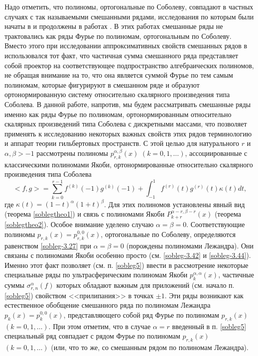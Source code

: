 Надо отметить, что полиномы, ортогональные по Соболеву, совпадают в частных случаях с так называемыми смешанными рядами, 
исследования по которым были начаты в \cite{sobleg-Shar11} и продолжены в работах
\cite{sobleg-Shar12, sobleg-Shar13, sobleg-Shar15, sobleg-Shar16, sobleg-Shar17, sobleg-Shar18, sobleg-sharap3}.  В этих работах смешанные ряды не трактовались как ряды Фурье по полиномам, ортогональным по Соболеву. Вместо этого при исследовании аппроксимативных свойств смешанных рядов в \cite{sobleg-Shar11, sobleg-Shar12, sobleg-Shar13, sobleg-Shar15, sobleg-Shar16, sobleg-Shar17, sobleg-Shar18, sobleg-sharap3} использовался тот факт, что  частичная сумма смешанного ряда представляет собой проектор на соответствующее подпространство алгебраических полиномов, не обращая внимание на то, что она является суммой Фурье по тем самым полиномам, которые фигурируют в смешанном ряде и образуют ортонормированную систему относительно скалярного произведения типа Соболева. В данной работе, напротив,  мы будем рассматривать смешанные ряды именно как ряды Фурье по полиномам, ортонормированным относительно скалярных произведений типа Соболева с дискретными массами, что позволяет применять к исследованию некоторых важных свойств этих рядов  терминологию и аппарат теории гильбертовых пространств. С этой целью для  натурального $r$ и $\alpha,\beta>-1$ рассмотрены полиномы $p^{\alpha,\beta}_{r,k}(x)$ $(k=0,1,\ldots)$, ассоциированные с  классическими полиномами Якоби, ортонормированные относительно скалярного произведения типа Соболева
\begin{equation}\label{sobleg-1.1}
<f,g>=\sum_{k=0}^{r-1}f^{(k)}(-1)g^{(k)}(-1)+\int_{-1}^1 f^{(r)}(t)g^{(r)}(t)\kappa(t)dt,
\end{equation}
где $\kappa(t)=(1-t)^\alpha(1+t)^\beta$. Для этих полиномов установлены явный вид (теорема \ref{soblegtheo1})  и связь с полиномами Якоби $P_{k+r}^{\alpha-r,\beta-r}(x)$ (теорема \ref{soblegtheo2}).  Особое внимание уделено случаю $\alpha=\beta=0$. Соответствующие полиномы $p_{r,k}(x)=p^{0,0}_{r,k}(x)$, ортогональные по Соболеву, определяются равенством \eqref{sobleg-3.27} при $\alpha=\beta=0$ (порождены полиномами Лежандра). Они связаны с полиномами Якоби особенно просто (см.  \eqref{sobleg-3.42} и \eqref{sobleg-3.44}). Именно этот факт позволяет   (см. п. \ref{sobleg5}) ввести в рассмотрение некоторые специальные ряды по ультрасферическим полиномам Якоби $p_k^{\alpha,\alpha}(x)$, частичные суммы $\sigma_{r,n}^\alpha(f)$ которых обладают важным для приложений (см. начало п. \ref{sobleg5}) свойством <<прилипания>> в точках $\pm1$. Эти ряды возникают как естественное обобщение смешанного ряда по полиномам Лежандра $p_k(x)=p_k^{0,0}(x)$, представляющего собой ряд Фурье  по полиномам $p_{r,k}(x)$  $(k=0,1,\ldots)$. При этом отметим, что в случае $\alpha=r$ введенный в п. \ref{sobleg5} специальный ряд совпадает с рядом Фурье по полиномам $p_{r,k}(x)$  $(k=0,1,\ldots)$ (или, что то же, со смешанным рядом по полиномам Лежандра).
